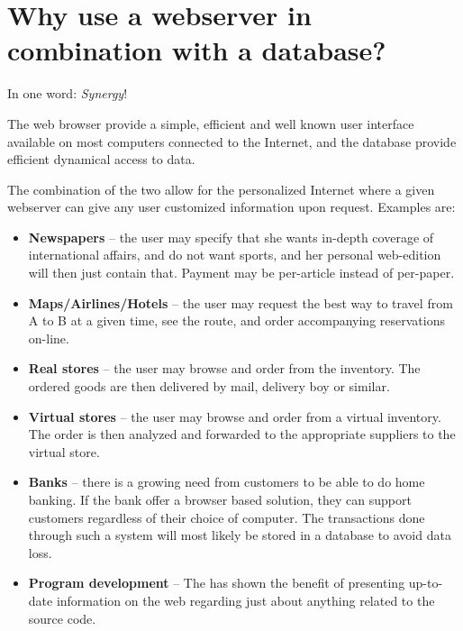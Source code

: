 \section{Why use a webserver in combination with a database?}
\label{sec:why-use-a-webserver-in-combination-with-a-database}

In one word: \textit{Synergy}!


The web browser provide a simple, efficient and well known user
interface available on most computers connected to the Internet, and
the database provide efficient dynamical access to data.

The combination of the two allow for the personalized Internet where a
given webserver can give any user customized information upon request.
Examples are:

\begin{itemize}
\item \textbf{Newspapers} -- the user may specify that she wants
  in-depth coverage of international affairs, and do not want sports,
  and her personal web-edition will then just contain that.  Payment
  may be per-article instead of per-paper.
  
\item \textbf{Maps/Airlines/Hotels} -- the user may request the best
  way to travel from A to B at a given time, see the route, and order
  accompanying reservations on-line.

\item \textbf{Real stores} -- the user may browse and order from the inventory.
  The ordered goods are then delivered by mail, delivery boy or
  similar.
  
\item \textbf{Virtual stores} -- the user may browse and order from a
  virtual inventory.  The order is then analyzed and forwarded to the
  appropriate suppliers to the virtual store.
  
\item \textbf{Banks} -- there is a growing need from customers to be
  able to do home banking.  If the bank offer a browser based
  solution, they can support customers regardless of their choice of
  computer.  The transactions done through such a system will most
  likely be stored in a database to avoid data loss.
  
\item \textbf{Program development} -- The
 has shown the benefit
of presenting up-to-date information on the web regarding just about
anything related to the source code.

\end{itemize}


